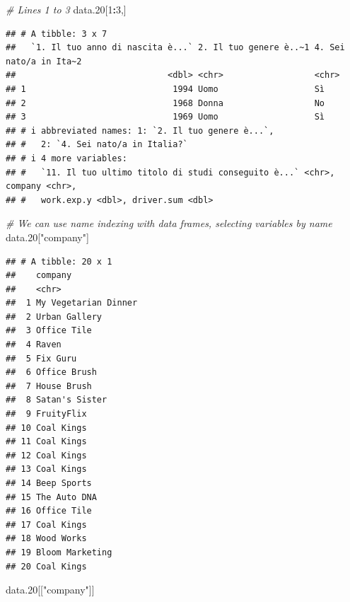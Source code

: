 \documentclass[
]{book}
\newenvironment{Shaded}{\begin{snugshade}}{\end{snugshade}}
\newcommand{\CommentTok}[1]{\textcolor[rgb]{0.56,0.35,0.01}{\textit{#1}}}
\newcommand{\DecValTok}[1]{\textcolor[rgb]{0.00,0.00,0.81}{#1}}
\newcommand{\FloatTok}[1]{\textcolor[rgb]{0.00,0.00,0.81}{#1}}
\newcommand{\NormalTok}[1]{#1}
\newcommand{\SpecialCharTok}[1]{\textcolor[rgb]{0.81,0.36,0.00}{\textbf{#1}}}
\newcommand{\StringTok}[1]{\textcolor[rgb]{0.31,0.60,0.02}{#1}}
\begin{document}
\begin{Shaded}
\begin{Highlighting}[]
\CommentTok{\# Lines 1 to 3}
\NormalTok{data}\FloatTok{.20}\NormalTok{[}\DecValTok{1}\SpecialCharTok{:}\DecValTok{3}\NormalTok{,]}
\end{Highlighting}
\end{Shaded}

\begin{verbatim}
## # A tibble: 3 x 7
##   `1. Il tuo anno di nascita è...` 2. Il tuo genere è..~1 4. Sei nato/a in Ita~2
##                              <dbl> <chr>                  <chr>                 
## 1                             1994 Uomo                   Sì                    
## 2                             1968 Donna                  No                    
## 3                             1969 Uomo                   Sì                    
## # i abbreviated names: 1: `2. Il tuo genere è...`,
## #   2: `4. Sei nato/a in Italia?`
## # i 4 more variables:
## #   `11. Il tuo ultimo titolo di studi conseguito è...` <chr>, company <chr>,
## #   work.exp.y <dbl>, driver.sum <dbl>
\end{verbatim}

\begin{Shaded}
\begin{Highlighting}[]
\CommentTok{\# We can use name indexing with data frames, selecting variables by name}
\NormalTok{data}\FloatTok{.20}\NormalTok{[}\StringTok{"company"}\NormalTok{]}
\end{Highlighting}
\end{Shaded}

\begin{verbatim}
## # A tibble: 20 x 1
##    company             
##    <chr>               
##  1 My Vegetarian Dinner
##  2 Urban Gallery       
##  3 Office Tile         
##  4 Raven               
##  5 Fix Guru            
##  6 Office Brush        
##  7 House Brush         
##  8 Satan's Sister      
##  9 FruityFlix          
## 10 Coal Kings          
## 11 Coal Kings          
## 12 Coal Kings          
## 13 Coal Kings          
## 14 Beep Sports         
## 15 The Auto DNA        
## 16 Office Tile         
## 17 Coal Kings          
## 18 Wood Works          
## 19 Bloom Marketing     
## 20 Coal Kings
\end{verbatim}

\begin{Shaded}
\begin{Highlighting}[]
\NormalTok{data}\FloatTok{.20}\NormalTok{[[}\StringTok{"company"}\NormalTok{]]}
\end{Highlighting}
\end{Shaded}
\end{document}
